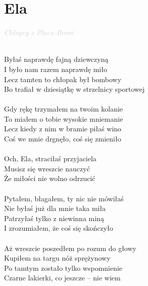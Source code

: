 \documentclass[a5paper, 10pt]{book}
\begin{document}
\newpage
\section{Ela}\textcolor{lightgray}{\textit{Chłopcy z Placu Broni}}\\~\\
\begin{minipage}[t]{0.8\textwidth}
Byłaś naprawdę fajną dziewczyną\\
I było nam razem naprawdę miło\\
Lecz tamten to chłopak był bombowy\\
Bo trafiał w dziesiątkę w strzelnicy sportowej\\
\\
Gdy rękę trzymałem na twoim kolanie\\
To miałem o tobie wysokie mniemanie\\
Lecz kiedy z nim w bramie piłaś wino\\
Coś we mnie drgnęło, coś się zmieniło\\
\\
\hspace*{5mm}Och, Ela, straciłaś przyjaciela\\
\hspace*{5mm}Musisz się wreszcie nauczyć\\
\hspace*{5mm}Że miłości nie wolno odrzucić\\
\\
Pytałem, błagałem, ty nic nie mówiłaś\\
Nie byłaś już dla mnie taka miła\\
Patrzyłaś tylko z niewinna miną\\
I zrozumiałem, że coś się skończyło\\
\\
Aż wreszcie poszedłem po rozum do głowy\\
Kupiłem na targu nóż sprężynowy\\
Po tamtym zostało tylko wspomnienie\\
Czarne lakierki, co jeszcze – nie wiem\\
\end{minipage}
\end{document}
